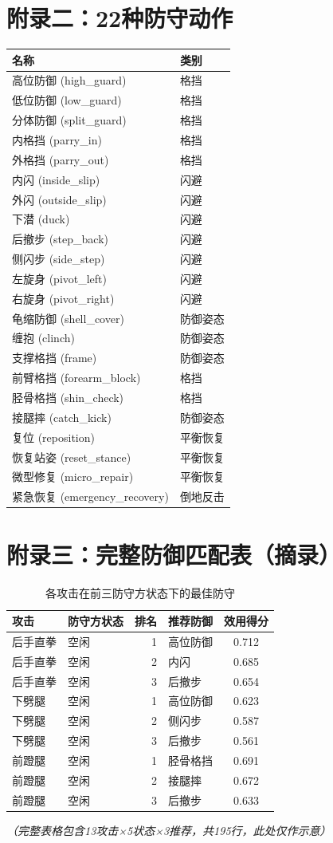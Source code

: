 \section{附录二：22种防守动作}
\begin{longtable}{ll}
\toprule
名称 & 类别 \\
\midrule
高位防御 (high\_guard) & 格挡 \\
低位防御 (low\_guard) & 格挡 \\
分体防御 (split\_guard) & 格挡 \\
内格挡 (parry\_in) & 格挡 \\
外格挡 (parry\_out) & 格挡 \\
内闪 (inside\_slip) & 闪避 \\
外闪 (outside\_slip) & 闪避 \\
下潜 (duck) & 闪避 \\
后撤步 (step\_back) & 闪避 \\
侧闪步 (side\_step) & 闪避 \\
左旋身 (pivot\_left) & 闪避 \\
右旋身 (pivot\_right) & 闪避 \\
龟缩防御 (shell\_cover) & 防御姿态 \\
缠抱 (clinch) & 防御姿态 \\
支撑格挡 (frame) & 防御姿态 \\
前臂格挡 (forearm\_block) & 格挡 \\
胫骨格挡 (shin\_check) & 格挡 \\
接腿摔 (catch\_kick) & 防御姿态 \\
复位 (reposition) & 平衡恢复 \\
恢复站姿 (reset\_stance) & 平衡恢复 \\
微型修复 (micro\_repair) & 平衡恢复 \\
紧急恢复 (emergency\_recovery) & 倒地反击 \\
\bottomrule
\end{longtable}

\section{附录三：完整防御匹配表（摘录）}
\begin{longtable}{l l r l c}
\caption{各攻击在前三防守方状态下的最佳防守}\\
\toprule
攻击 & 防守方状态 & 排名 & 推荐防御 & 效用得分 \\
\midrule
后手直拳 & 空闲 & 1 & 高位防御 & 0.712 \\
后手直拳 & 空闲 & 2 & 内闪 & 0.685 \\
后手直拳 & 空闲 & 3 & 后撤步 & 0.654 \\
下劈腿 & 空闲 & 1 & 高位防御 & 0.623 \\
下劈腿 & 空闲 & 2 & 侧闪步 & 0.587 \\
下劈腿 & 空闲 & 3 & 后撤步 & 0.561 \\
前蹬腿 & 空闲 & 1 & 胫骨格挡 & 0.691 \\
前蹬腿 & 空闲 & 2 & 接腿摔 & 0.672 \\
前蹬腿 & 空闲 & 3 & 后撤步 & 0.633 \\
\bottomrule
\end{longtable}
\textit{（完整表格包含13攻击×5状态×3推荐，共195行，此处仅作示意）}
